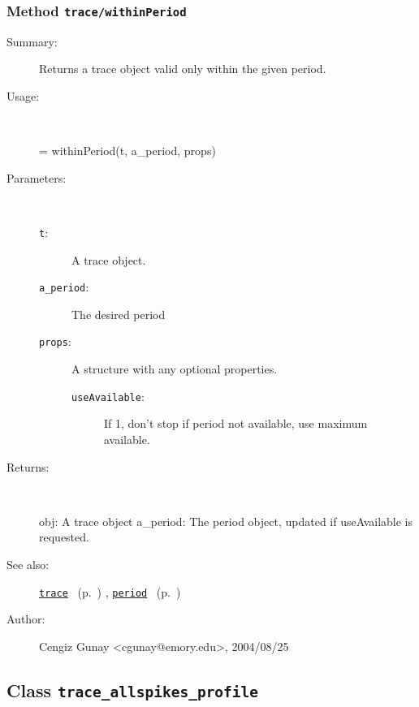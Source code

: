 \subsubsection[Method \texttt{withinPeriod}]{Method \texttt{trace/withinPeriod}}%
%
\label{ref_trace__withinPeriod}%
\hypertarget{ref_trace__withinPeriod}{}%
\begin{description}
\item[Summary:]Returns a trace object valid only within the given period.
%
\item[Usage:]~%
\begin{lyxcode}%
[obj a\_period] = withinPeriod(t, a\_period, props)
%
\end{lyxcode}%
%
%
\item[Parameters:]~
\begin{description}%
\item[\texttt{t}:]
 A trace object.
\item[\texttt{a\_period}:]
 The desired period
\item[\texttt{props}:]
 A structure with any optional properties.
\begin{description}%
\item[\texttt{useAvailable}:]
 If 1, don't stop if period not available, use maximum available.
\end{description}%
\end{description}%
%
\item[Returns:
]~

	obj: A trace object
	a\_period: The period object, updated if useAvailable is requested.
%
%
\item[See also:]%
\hyperlink{ref_trace}{\texttt{trace}}%
\ (p.~\pageref{ref_trace})%
%
, \hyperlink{ref_period}{\texttt{period}}%
\ (p.~\pageref{ref_period})%
%
%
\item[Author:]%
Cengiz Gunay <cgunay@emory.edu>, 2004/08/25
%
\end{description}
\methodline%
\subsection{Class \texttt{trace\_allspikes\_profile}}%
%
\label{ref_trace_allspikes_profile}%
\hypertarget{ref_trace_allspikes_profile}{}%
